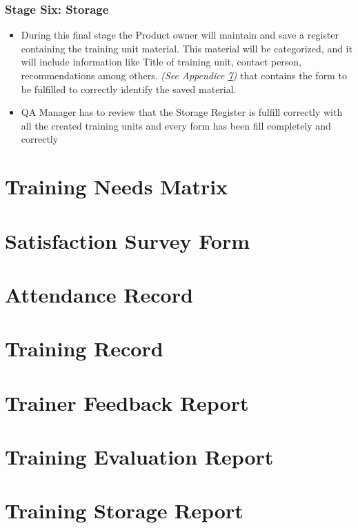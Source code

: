 \documentclass{template/openetcs_article}
\begin{document}
\subsubsection{Stage Six: Storage}
\begin{itemize}
\item During this final stage the Product owner will maintain and save a register containing the training unit material. This material will be categorized, and it will include information like Title of training unit, contact person, recommendations among others. {\it {(See Appendice \ref{App:Training-Storage-Report})}} that contains the form to be fulfilled to correctly identify the saved material.
\item QA Manager has to review that the Storage Register is fulfill correctly with all the created training units and every form has been fill completely and correctly
\end{itemize}

\newpage
\begin{appendices}
   \addappheadtotoc
   \appendixpage
\section{Training Needs Matrix} 
\label{App:Training-Needs-Matrix}

\section{Satisfaction Survey Form} 
\label{App:Satisfaction-Survey-form}

\section{Attendance Record} 
\label{App:Attendance-Record}

\section{Training Record} 
\label{App:Training-Record}

\section{Trainer Feedback Report} 
\label{App:Trainer-Feedback-Report}

\section{Training Evaluation Report} 
\label{App:Training-Evaluation-Report}

\section{Training Storage Report} 
\label{App:Training-Storage-Report}
\end{appendices}
\end{document}
